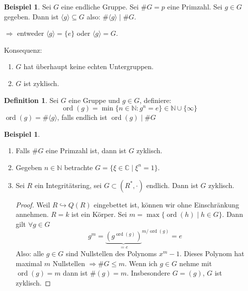 \documentclass[12pt,parskip=full]{scrartcl}
\newcommand{\setN}{\mathbb{N}}
\newcommand{\setC}{\mathbb{C}}
\theoremstyle{definition}
\newtheorem{definition}[theorem]{Definition}
\newtheorem{example}[theorem]{Beispiel}
\theoremstyle{remark}
\begin{document}
	\begin{example}
		Sei $G$ eine endliche Gruppe. Sei $\#G = p$ eine Primzahl. Sei $g \in G$ gegeben. Dann ist $\langle g \rangle \subseteq G$ also: $\#\langle g \rangle \mid \#G$.
		
		$\Rightarrow$ entweder $\langle g \rangle = \{ e \}$ oder $\langle g \rangle = G$.
		
		Konsequenz:
		\begin{enumerate}
			\item $G$ hat überhaupt keine echten Untergruppen.
			\item $G$ ist zyklisch.
		\end{enumerate}
	\end{example}

	\begin{definition}
		Sei $G$ eine Gruppe und $g \in G$, definiere:
		\begin{equation*}
			\operatorname{ord}(g) = \min \{ n \in \setN : g^n = e \} \in \setN \cup \{ \infty \}
		\end{equation*}
		$\operatorname{ord}(g) = \# \langle g \rangle$, falls endlich ist $\operatorname{ord}(g) \mid \#G$
	\end{definition}

	\begin{example}
		\begin{enumerate}
			\item Falls $\#G$ eine Primzahl ist, dann ist $G$ zyklisch.
			\item Gegeben $n \in \setN$ betrachte $G = \{ \xi \in \setC \mid \xi^n = 1 \}$.
			\item Sei $R$ ein Integritätsring, sei $G \subset (R^*, \cdot)$ endlich. Dann ist $G$ zyklisch.
			\begin{proof}
				Weil $R \hookrightarrow Q(R)$ eingebettet ist, können wir ohne Einschränkung annehmen. $R = k$ ist ein Körper. Sei $m = \max \{ \operatorname{ord}(h) \mid h \in G \}$. Dann gilt $\forall g \in G$
				\begin{equation*}
					g^m = {\underbrace{\left( g^{\operatorname{ord}(g)} \right)}_{=e}}^{m/\operatorname{ord}(g)} = e
				\end{equation*}
				Also: alle $g \in G$ sind Nullstellen des Polynoms $x^m - 1$. Dieses Polynom hat maximal $m$ Nullstellen $\Rightarrow \#G \leq m$. Wenn ich $g \in G$ nehme mit $\operatorname{ord}(g) = m$ dann ist $\#(g) = m$. Insbesondere $G = (g)$, $G$ ist zyklisch.
			\end{proof}
		\end{enumerate}
	\end{example}
\end{document}
